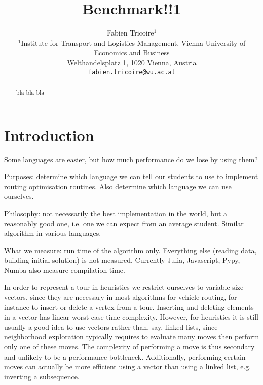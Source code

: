 \documentclass[11pt,a4paper,notitlepage]{article}
\begin{document}
\title{Benchmark!!1}
\author{
Fabien Tricoire$^{1}$ \\[1ex]
 \small $^1$Institute for Transport and Logistics Management,
 Vienna University of Economics and Business\\
 \small Welthandelsplatz 1, 1020 Vienna, Austria\\
  \small \texttt{fabien.tricoire@wu.ac.at}\\[2ex]
}
\date{}
\maketitle

\begin{abstract}
  bla bla bla
\end{abstract}

\section{Introduction}
\label{sec:intro}

Some languages are easier, but how much performance do we lose by
using them?

Purposes: determine which language we can tell our students to
use to implement routing optimisation routines. Also determine which
language we can use ourselves.

Philosophy: not necessarily the best
implementation in the world, but a reasonably good one, i.e. one we
can expect from an average student. Similar algorithm in various languages.

What we measure: run time of the algorithm only. Everything else
(reading data, building initial solution) is not measured. Currently
Julia, Javascript, Pypy, Numba also measure compilation time.

In order to represent a tour in heuristics we restrict ourselves to
variable-size vectors, since they are necessary in most algorithms for
vehicle routing, for instance to insert or delete a vertex from a
tour.
Inserting and deleting elements in a vector has linear worst-case time
complexity. However, for heuristics it is still usually a good idea to
use vectors rather than, say, linked lists, since neighborhood
exploration typically requires to evaluate many moves then perform
only one of these moves. The complexity of performing a move is thus
secondary and unlikely to be a performance bottleneck. Additionally,
performing certain moves can actually be more efficient using a
vector than using a linked list, e.g. inverting a subsequence.
\end{document}
